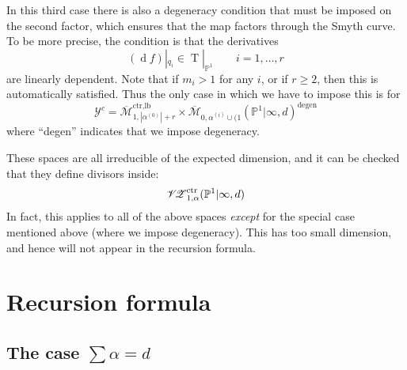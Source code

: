 \documentclass[11pt]{amsart}
\newcommand{\oM}{\overline{\mathcal{M}}}
\newcommand{\M}[4]{\overline{\mathcal{M}}_{#1,#2}(#3,#4)}
\newcommand{\PP}{\mathbb P}
\newcommand{\VZc}[4]{\mathcal{V\!Z}^{\rm{ctr}}_{#1,#2}(#3,#4)}
\theoremstyle{definition}
\theoremstyle{definition}
\begin{document}
In this third case there is also a degeneracy condition that must be imposed on the second factor, which ensures that the map factors through the Smyth curve. To be more precise, the condition is that the derivatives
\begin{equation*} (\operatorname{d}\!f)|_{q_i} \in \operatorname{T}|_{\PP^1} \qquad i=1,\ldots,r \end{equation*}
are linearly dependent. Note that if $m_i > 1$ for any $i$, or if $r \geq 2$, then this is automatically satisfied. Thus the only case in which we have to impose this is for
\begin{equation*} \mathcal{Y}^c = \oM^{\operatorname{ctr,lb}}_{1,|\alpha^{(0)}|+r} \times {\M{0}{\alpha^{(i)}\cup (1}{\PP^1|\infty}{d}}^{\operatorname{degen}} \end{equation*}
where ``degen'' indicates that we impose degeneracy.

These spaces are all irreducible of the expected dimension, and it can be checked that they define divisors inside:
\begin{equation*} \VZc{1}{\alpha}{\PP^1|\infty}{d} \end{equation*}
In fact, this applies to all of the above spaces \emph{except} for the special case mentioned above (where we impose degeneracy). This has too small dimension, and hence will not appear in the recursion formula.

\section{Recursion formula}

\subsection{The case $\sum\alpha=d$}
\end{document}
